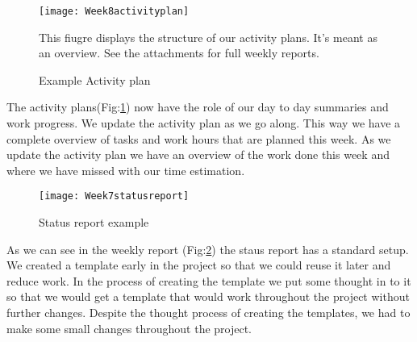     \begin{figure}[h]
        \centering
        \texttt{[image: Week8activityplan]}
        \caption{Example Activity plan}
        This fiugre displays the structure of our activity plans. It's meant as an overview. See the attachments for full weekly reports. 
        \label{fig:Week8activityplan}
    \end{figure}
    
    The activity plans(Fig:\ref{fig:Week8activityplan}) now have the role of our day to day summaries and work progress. We update the activity plan as we go along. This way we have a complete overview of tasks and work hours that are planned this week. As we update the activity plan we have an overview of the work done this week and where we have missed with our time estimation. 
    
    \begin{figure}[h]
        \centering
        \texttt{[image: Week7statusreport]}
        \caption{Status report example}
        \label{fig:Week7statusreport}
    \end{figure}
    
    As we can see in the weekly report (Fig:\ref{fig:Week7statusreport}) the staus report has a standard setup. We created a template early in the project so that we could reuse it later and reduce work. In the process of creating the template we put some thought in to it so that we would get a template that would work throughout the project without further changes. Despite the thought process of creating the templates, we had to make some small changes throughout the project.
    
